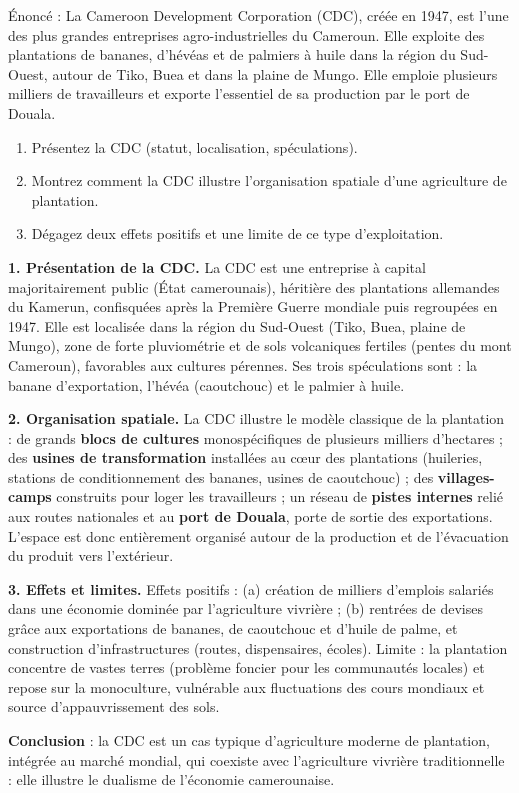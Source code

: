\documentclass[11pt]{article}
\newcommand{\cle}[1]{{\popxbold\color{popdark}#1}}
\begin{document}
\begin{exoresolu}
Énoncé : La Cameroon Development Corporation (CDC), créée en 1947, est l'une des plus grandes entreprises agro-industrielles du Cameroun. Elle exploite des plantations de bananes, d'hévéas et de palmiers à huile dans la région du Sud-Ouest, autour de Tiko, Buea et dans la plaine de Mungo. Elle emploie plusieurs milliers de travailleurs et exporte l'essentiel de sa production par le port de Douala.
\begin{enumerate}
\item Présentez la CDC (statut, localisation, spéculations).
\item Montrez comment la CDC illustre l'organisation spatiale d'une agriculture de plantation.
\item Dégagez deux effets positifs et une limite de ce type d'exploitation.
\end{enumerate}
\tcblower
\textbf{1. Présentation de la CDC.}
La CDC est une entreprise à capital majoritairement public (État camerounais), héritière des plantations allemandes du Kamerun, confisquées après la Première Guerre mondiale puis regroupées en 1947. Elle est localisée dans la région du Sud-Ouest (Tiko, Buea, plaine de Mungo), zone de forte pluviométrie et de sols volcaniques fertiles (pentes du mont Cameroun), favorables aux cultures pérennes. Ses trois spéculations sont : la \cle{banane} d'exportation, l'\cle{hévéa} (caoutchouc) et le \cle{palmier à huile}.

\textbf{2. Organisation spatiale.}
La CDC illustre le modèle classique de la plantation : de grands \textbf{blocs de cultures} monospécifiques de plusieurs milliers d'hectares ; des \textbf{usines de transformation} installées au cœur des plantations (huileries, stations de conditionnement des bananes, usines de caoutchouc) ; des \textbf{villages-camps} construits pour loger les travailleurs ; un réseau de \textbf{pistes internes} relié aux routes nationales et au \textbf{port de Douala}, porte de sortie des exportations. L'espace est donc entièrement organisé autour de la production et de l'évacuation du produit vers l'extérieur.

\textbf{3. Effets et limites.}
Effets positifs : (a) création de milliers d'emplois salariés dans une économie dominée par l'agriculture vivrière ; (b) rentrées de devises grâce aux exportations de bananes, de caoutchouc et d'huile de palme, et construction d'infrastructures (routes, dispensaires, écoles). Limite : la plantation concentre de vastes terres (problème foncier pour les communautés locales) et repose sur la monoculture, vulnérable aux fluctuations des cours mondiaux et source d'appauvrissement des sols.

\textbf{Conclusion} : la CDC est un cas typique d'agriculture moderne de plantation, intégrée au marché mondial, qui coexiste avec l'agriculture vivrière traditionnelle : elle illustre le \cle{dualisme} de l'économie camerounaise.
\end{exoresolu}
\end{document}

